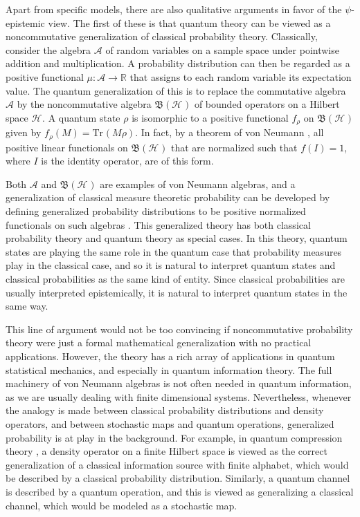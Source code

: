 \documentclass[DIV=calc,paper=a4,fontsize=11pt,twocolumn]{scrartcl} %
\theoremstyle{definition}
\theoremstyle{plain}
\newcommand{\Hilb}[1][]{\ensuremath{\mathcal{H}_{#1}}}
\newcommand{\Tr}[2][]{\ensuremath{\text{Tr}_{#1} \left ( #2 \right )}}
\begin{document}
Apart from specific models, there are also qualitative arguments in
favor of the $\psi$-epistemic view.  The first of these is that
quantum theory can be viewed as a noncommutative generalization of
classical probability theory.  Classically, consider the algebra
$\mathcal{A}$ of random variables on a sample space under pointwise
addition and multiplication.  A probability distribution can then be
regarded as a positive functional $\mu:\mathcal{A} \rightarrow
\mathbb{R}$ that assigns to each random variable its expectation
value.  The quantum generalization of this is to replace the
commutative algebra $\mathcal{A}$ by the noncommutative algebra
$\mathfrak{B} \left ( \Hilb \right )$ of bounded operators on a
Hilbert space $\Hilb$.  A quantum state $\rho$ is isomorphic to a
positive functional $f_{\rho}$ on $\mathfrak{B}(\Hilb)$ given by
$f_{\rho}(M) = \Tr{M \rho}$.  In fact, by a theorem of von Neumann
\cite{Neumann1955}, all positive linear functionals on $\mathfrak{B}
\left ( \Hilb \right )$ that are normalized such that $f(I) = 1$,
where $I$ is the identity operator, are of this form.

Both $\mathcal{A}$ and $\mathfrak{B} \left ( \Hilb \right )$ are
examples of von Neumann algebras, and a generalization of classical
measure theoretic probability can be developed by defining generalized
probability distributions to be positive normalized functionals on
such algebras \cite{Redei2007, Petz2008}.  This generalized theory has
both classical probability theory and quantum theory as special cases.
In this theory, quantum states are playing the same role in the
quantum case that probability measures play in the classical case, and
so it is natural to interpret quantum states and classical
probabilities as the same kind of entity.  Since classical
probabilities are usually interpreted epistemically, it is natural to
interpret quantum states in the same way.

This line of argument would not be too convincing if noncommutative
probability theory were just a formal mathematical generalization with
no practical applications.  However, the theory has a rich array of
applications in quantum statistical mechanics, and especially in
quantum information theory.  The full machinery of von Neumann
algebras is not often needed in quantum information, as we are usually
dealing with finite dimensional systems.  Nevertheless, whenever the
analogy is made between classical probability distributions and
density operators, and between stochastic maps and quantum operations,
generalized probability is at play in the background.  For example, in
quantum compression theory \cite{Schumacher1995}, a density operator
on a finite Hilbert space is viewed as the correct generalization of a
classical information source with finite alphabet, which would be
described by a classical probability distribution.  Similarly, a
quantum channel is described by a quantum operation, and this is
viewed as generalizing a classical channel, which would be modeled as
a stochastic map.
\end{document}
